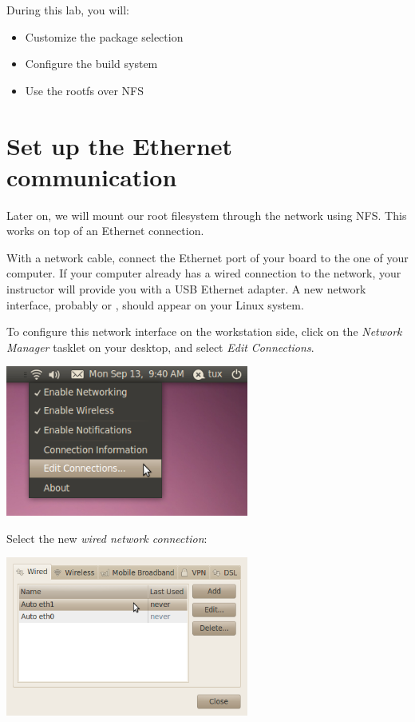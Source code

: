 
During this lab, you will:
\begin{itemize}
  \item Customize the package selection
  \item Configure the build system
  \item Use the rootfs over NFS
\end{itemize}

\section{Set up the Ethernet communication}

Later on, we will mount our root filesystem through the network using
NFS. This works on top of an Ethernet connection.

With a network cable, connect the Ethernet port of your board to the
one of your computer. If your computer already has a wired connection
to the network, your instructor will provide you with a USB Ethernet
adapter. A new network interface, probably  or ,
should appear on your Linux system.

To configure this network interface on the workstation side, click on
the {\em Network Manager} tasklet on your desktop, and select {\em
Edit Connections}.

\begin{center}
\includegraphics[width=8cm]{../labs/yocto-advanced-configuration/network-config-1.png}
\end{center}

Select the new {\em wired network connection}:

\begin{center}
\includegraphics[width=8cm]{../labs/yocto-advanced-configuration/network-config-2.png}
\end{center}

